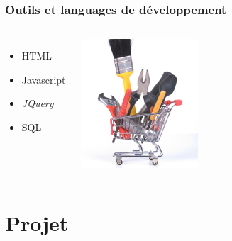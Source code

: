 \documentclass{beamer}
\begin{document}
\begin{frame}[fragile]
  \frametitle{Outils et languages de développement}


\begin{columns}[c]

  \begin{itemize}
   \item HTML
   \item Javascript
   \item \textit{JQuery}
   \item \alert{SQL}
  \end{itemize}  

  \begin{center}
    \includegraphics[height=13em]{skill-set.jpg}
  \end{center}
\end{columns}
\end{frame}

\section{Projet}

\end{document}
